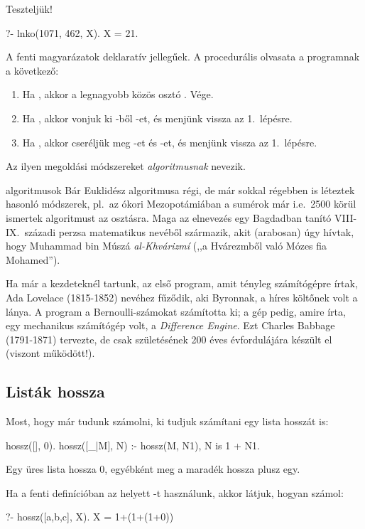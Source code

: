 Teszteljük!
\begin{query}
?- lnko(1071, 462, X).
X = 21.
\end{query}

A fenti magyarázatok deklaratív jellegűek. A
procedurális olvasata a programnak a következő:
\begin{enumerate}
\item Ha , akkor a legnagyobb közös osztó
  . Vége.
\item Ha , akkor vonjuk ki -ből
  -et, és menjünk vissza az 1.~lépésre.
\item Ha , akkor cseréljük meg -et
  és -et, és menjünk vissza az 1.~lépésre.
\end{enumerate}
Az ilyen megoldási módszereket \emph{algoritmusnak}
nevezik.

\begin{infobox}{}{algoritmusok}
Bár Euklidész algoritmusa régi, de már sokkal
régebben is léteztek hasonló módszerek, pl.~az ókori
Mezopotámiában a sumérok már i.e.~2500 körül
ismertek algoritmust az osztásra. Maga az elnevezés
egy Bagdadban tanító VIII-IX.~századi perzsa
matematikus nevéből származik, akit (arabosan) úgy
hívtak, hogy Muhammad bin Múszá \emph{al-Khvárizmí}
(,,a Hvárezmből való Mózes fia Mohamed'').

Ha már a kezdeteknél tartunk, az első program, amit
tényleg számítógépre írtak, Ada Lovelace (1815-1852)
nevéhez fűződik, aki Byronnak, a híres költőnek volt
a lánya. A program a Bernoulli-számokat számította
ki; a gép pedig, amire írta, egy mechanikus
számítógép volt, a \emph{Difference Engine}. Ezt
Charles Babbage (1791-1871) tervezte, de csak
születésének 200 éves évfordulájára készült el
(viszont működött!).
\end{infobox}

\subsection*{Listák hossza}
Most, hogy már tudunk számolni, ki tudjuk számítani
egy lista hosszát is:
\begin{program}
hossz([], 0).
hossz([_|M], N) :- hossz(M, N1), N is 1 + N1.
\end{program}
Egy üres lista hossza 0, egyébként meg a maradék
hossza plusz egy.

Ha a fenti definícióban az  helyett \pr{=}-t
használunk, akkor látjuk, hogyan számol:
\begin{query}
?- hossz([a,b,c], X).
X = 1+(1+(1+0))
\end{query}

